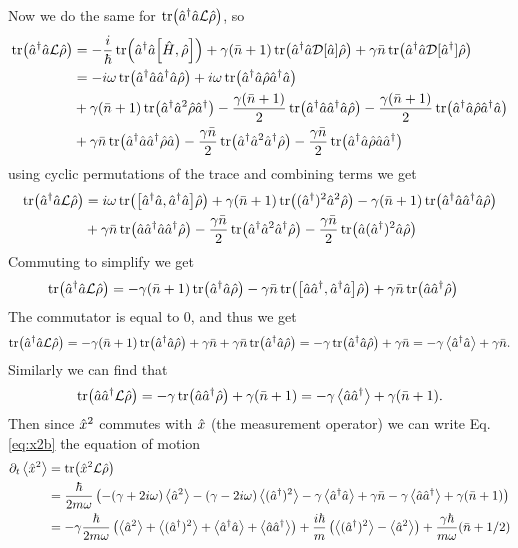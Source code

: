 Now we do the same for $\tr(\hat{a}^{\dagger}\hat{a}\mathcal{L}\hat{\rho})$, so
\begin{align}
    \tr(\ad\a\mathcal{L}\dmatrix) &= -\frac{i}{\hbar}\tr(\ad\a\comm{\hamiltonian}{\dmatrix}) + \gamma(\nbar + 1)\tr(\ad\a\mathcal{D}[\a]\dmatrix) + \gamma \nbar \tr(\ad\a\mathcal{D}[\ad]\dmatrix)\\
    &= -i\omega \tr(\ad\a\ad\a\dmatrix) + i\omega \tr(\ad\a\dmatrix\ad\a)\\
    &+ \gamma(\nbar + 1)\tr(\ad\a^2\dmatrix\ad) - \frac{\gamma(\nbar + 1)}{2}\tr(\ad\a\ad\a\dmatrix) - \frac{\gamma(\nbar + 1)}{2}\tr(\ad\a\dmatrix\ad\a)\\
    &+ \gamma\nbar\tr(\ad\a\ad\dmatrix\a) - \frac{\gamma\nbar}{2}\tr(\ad\a^2\ad\dmatrix) - \frac{\gamma\nbar}{2}\tr(\ad\a\dmatrix\a\ad)
\end{align}
using cyclic permutations of the trace and combining terms we get
\begin{align}
    \tr(\ad\a\mathcal{L}\dmatrix) &= i\omega\tr(\comm{\ad\a}{\ad\a}\dmatrix) + \gamma(\nbar + 1) \tr((\ad)^2\a^2 \dmatrix) -\gamma (\nbar + 1)\tr(\ad\a\ad\a\dmatrix)\\
    &+ \gamma\nbar\tr(\a\ad\a\ad\dmatrix) - \frac{\gamma \nbar}{2} \tr(\ad\a^2\ad\dmatrix) - \frac{\gamma \nbar}{2} \tr(\a (\ad)^2 \a \dmatrix)
\end{align}
Commuting to simplify we get
\begin{align}
    \tr(\ad\a\mathcal{L}\dmatrix) &= - \gamma(\nbar + 1) \tr(\ad\a\dmatrix) - \gamma \nbar \tr(\comm{\a\ad}{\ad\a} \dmatrix) + \gamma \nbar \tr(\a\ad\dmatrix)
\end{align}
The commutator is equal to 0, and thus we get
\begin{equation}
    \tr(\hat{a}^{\dagger}\hat{a}\mathcal{L}\hat{\rho}) = - \gamma(\bar{n} + 1) \tr(\hat{a}^{\dagger}\hat{a}\hat{\rho}) +\gamma \bar{n} + \gamma\bar{n} \tr(\hat{a}^{\dagger}\hat{a}\hat{\rho}) = -\gamma \tr(\hat{a}^{\dagger}\hat{a}\hat{\rho}) + \gamma\bar{n} = -\gamma \expval{\hat{a}^{\dagger}\hat{a}} + \gamma\bar{n}.
\end{equation}
Similarly we can find that
\begin{equation}
    \tr(\hat{a}\hat{a}^{\dagger}\mathcal{L}\hat{\rho}) = -\gamma \tr(\hat{a}\hat{a}^{\dagger}\hat{\rho}) + \gamma(\bar{n} + 1) = -\gamma \expval{\hat{a}\hat{a}^{\dagger}} + \gamma(\bar{n} + 1).
\end{equation}
Then since $\hat{x}^2$ commutes with $\hat{x}$ (the measurement operator) we can write Eq. \eqref{eq:x2b} the equation of motion
\begin{align}
    \partial_t\expval{\hat{x}^2} &= \tr(\hat{x}^2\mathcal{L}\hat{\rho}) \\
    &= \frac{\hbar}{2 m \omega} \left( -(\gamma + 2 i \omega)\expval{\hat{a}^2} -(\gamma - 2 i \omega)\expval{(\hat{a}^{\dagger})^2} - \gamma\expval{\hat{a}^{\dagger}\hat{a}} + \gamma\bar{n} - \gamma\expval{\hat{a}\hat{a}^{\dagger}} + \gamma(\bar{n}+1) \right)\\
    &= -\gamma \frac{\hbar}{2 m \omega} \left( \expval{\hat{a}^2} + \expval{(\hat{a}^{\dagger})^2} + \expval{\hat{a}^{\dagger}\hat{a}} + \expval{\hat{a}\hat{a}^{\dagger}} \right) + \frac{i\hbar}{m}\left( \expval{(\hat{a}^{\dagger})^2} - \expval{\hat{a}^2} \right) + \frac{\gamma \hbar}{m\omega}(\bar{n} + 1/2)
\end{align}
